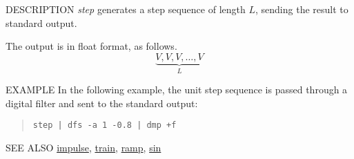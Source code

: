 \begin{synopsis}
\item[step] [ --l $L$ ] [ --n $N$ ] [ --v $V$ ]
\end{synopsis}

\begin{qsection}{DESCRIPTION}
{\em step} generates a step sequence of length $L$, 
sending the result to standard output.

The output is in float format, as follows.
\begin{displaymath}
\underbrace{V, V, V, \dots, V}_{L}
\end{displaymath}
\end{qsection}

\begin{options}
\end{options}

\begin{qsection}{EXAMPLE}
In the following example, the unit step sequence is passed through
a digital filter and sent to the standard output:
\begin{quote}
\verb!step | dfs -a 1 -0.8 | dmp +f!
\end{quote}
\end{qsection}

\begin{qsection}{SEE ALSO}
\hyperlink{impulse}{impulse},
\hyperlink{train}{train},
\hyperlink{ramp}{ramp},
\hyperlink{sin}{sin}
\end{qsection}
